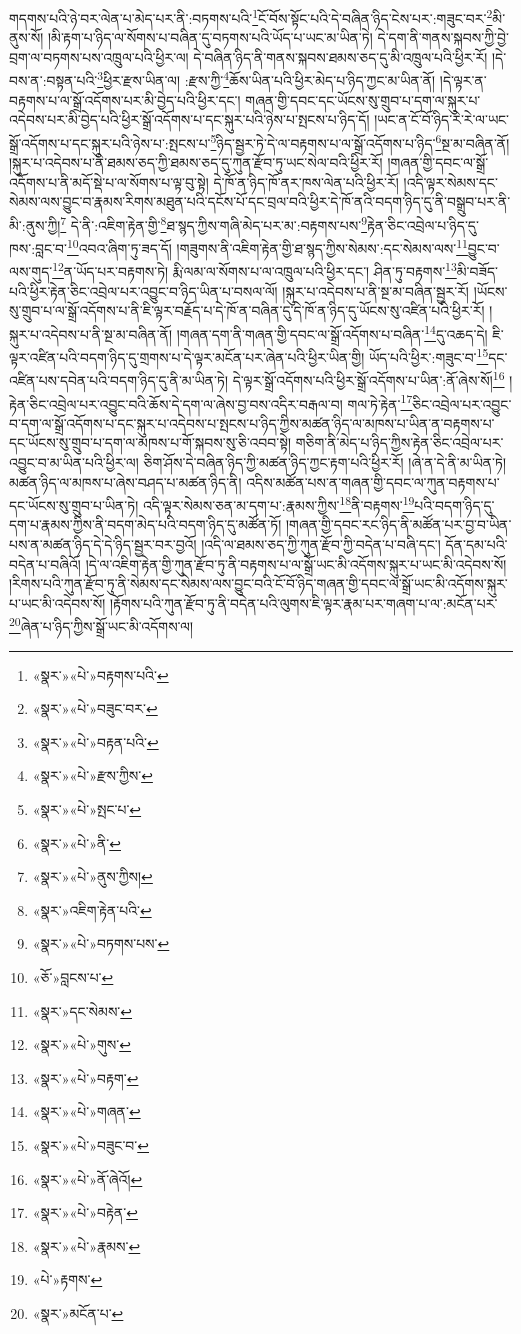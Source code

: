 གདགས་པའི་ཉེ་བར་ལེན་པ་མེད་པར་ནི་:བཏགས་པའི་\footnote{«སྣར་»«པེ་»བརྟགས་པའི་}ངོ་བོས་སྟོང་པའི་དེ་བཞིན་ཉིད་ངེས་པར་:གཟུང་བར་\footnote{«སྣར་»«པེ་»བཟུང་བར་}མི་ནུས་སོ། །མི་རྟག་པ་ཉིད་ལ་སོགས་པ་བཞིན་དུ་བཏགས་པའི་ཡོད་པ་ཡང་མ་ཡིན་ཏེ། དེ་དག་ནི་གནས་སྐབས་ཀྱི་བྱེ་བྲག་ལ་བཏགས་པས་འཁྲུལ་པའི་ཕྱིར་ལ། དེ་བཞིན་ཉིད་ནི་གནས་སྐབས་ཐམས་ཅད་དུ་མི་འཁྲུལ་པའི་ཕྱིར་རོ། །དེ་བས་ན་:བསྟན་པའི་\footnote{«སྣར་»«པེ་»བརྟན་པའི་}ཕྱིར་རྫས་ཡིན་ལ། :རྫས་ཀྱི་\footnote{«སྣར་»«པེ་»རྫས་ཀྱིས་}ཆོས་ཡིན་པའི་ཕྱིར་མེད་པ་ཉིད་ཀྱང་མ་ཡིན་ནོ། །དེ་ལྟར་ན་བརྟགས་པ་ལ་སྒྲོ་འདོགས་པར་མི་བྱེད་པའི་ཕྱིར་དང་། གཞན་གྱི་དབང་དང་ཡོངས་སུ་གྲུབ་པ་དག་ལ་སྐུར་པ་འདེབས་པར་མི་བྱེད་པའི་ཕྱིར་སྒྲོ་འདོགས་པ་དང་སྐུར་པའི་ཉེས་པ་སྤངས་པ་ཉིད་དོ། །ཡང་ན་ངོ་བོ་ཉིད་རེ་རེ་ལ་ཡང་སྒྲོ་འདོགས་པ་དང་སྐུར་པའི་ཉེས་པ་:སྤངས་པ་\footnote{«སྣར་»«པེ་»སྤང་པ་}ཉིད་སྦྱར་ཏེ་དེ་ལ་བརྟགས་པ་ལ་སྒྲོ་འདོགས་པ་ཉིད་\footnote{«སྣར་»«པེ་»ནི་}སྔ་མ་བཞིན་ནོ། །སྐུར་པ་འདེབས་པ་ནི་ཐམས་ཅད་ཀྱི་ཐམས་ཅད་དུ་ཀུན་རྫོབ་ཏུ་ཡང་སེལ་བའི་ཕྱིར་རོ། །གཞན་གྱི་དབང་ལ་སྒྲོ་འདོགས་པ་ནི་མདོ་སྡེ་པ་ལ་སོགས་པ་ལྟ་བུ་སྟེ། དེ་ཁོ་ན་ཉིད་ཁོ་ནར་ཁས་ལེན་པའི་ཕྱིར་རོ། །འདི་ལྟར་སེམས་དང་སེམས་ལས་བྱུང་བ་རྣམས་རིགས་མཐུན་པའི་དངོས་པོ་དང་བྲལ་བའི་ཕྱིར་དེ་ཁོ་ནའི་བདག་ཉིད་དུ་ནི་བསྒྲུབ་པར་ནི་མི་:ནུས་ཀྱི།\footnote{«སྣར་»«པེ་»ནུས་ཀྱིས།} དེ་ནི་:འཇིག་རྟེན་གྱི་\footnote{«སྣར་»འཇིག་རྟེན་པའི་}ཐ་སྙད་ཀྱིས་གཞི་མེད་པར་མ་:བརྟགས་པས་\footnote{«སྣར་»«པེ་»བཏགས་པས་}རྟེན་ཅིང་འབྲེལ་པ་ཉིད་དུ་ཁས་:བླང་བ་\footnote{«ཅོ་»བླངས་པ་}འབའ་ཞིག་ཏུ་ཟད་དོ། །གཟུགས་ནི་འཇིག་རྟེན་གྱི་ཐ་སྙད་ཀྱིས་སེམས་:དང་སེམས་ལས་\footnote{«སྣར་»དང་སེམས་}བྱུང་བ་ལས་གུད་\footnote{«སྣར་»«པེ་»གུས་}ན་ཡོད་པར་བརྟགས་ཏེ། རྨི་ལམ་ལ་སོགས་པ་ལ་འཁྲུལ་པའི་ཕྱིར་དང་། ཤིན་ཏུ་བརྟགས་\footnote{«སྣར་»«པེ་»བརྟག་}མི་བཟོད་པའི་ཕྱིར་རྟེན་ཅིང་འབྲེལ་པར་འབྱུང་བ་ཉིད་ཡིན་པ་བསལ་ལོ། །སྐུར་པ་འདེབས་པ་ནི་སྔ་མ་བཞིན་སྦྱར་རོ། །ཡོངས་སུ་གྲུབ་པ་ལ་སྒྲོ་འདོགས་པ་ནི་ཇི་ལྟར་བརྗོད་པ་དེ་ཁོ་ན་བཞིན་དུ་དེ་ཁོ་ན་ཉིད་དུ་ཡོངས་སུ་འཛིན་པའི་ཕྱིར་རོ། །སྐུར་པ་འདེབས་པ་ནི་སྔ་མ་བཞིན་ནོ། །གཞན་དག་ནི་གཞན་གྱི་དབང་ལ་སྒྲོ་འདོགས་པ་བཞིན་\footnote{«སྣར་»«པེ་»གཞན་}དུ་འཆད་དེ། ཇི་ལྟར་འཛིན་པའི་བདག་ཉིད་དུ་གྲགས་པ་དེ་ལྟར་མངོན་པར་ཞེན་པའི་ཕྱིར་ཡིན་གྱི། ཡོད་པའི་ཕྱིར་:གཟུང་བ་\footnote{«སྣར་»«པེ་»བཟུང་བ་}དང་འཛིན་པས་དབེན་པའི་བདག་ཉིད་དུ་ནི་མ་ཡིན་ཏེ། དེ་ལྟར་སྒྲོ་འདོགས་པའི་ཕྱིར་སྒྲོ་འདོགས་པ་ཡིན་:ནོ་ཞེས་སོ།\footnote{«སྣར་»«པེ་»ནོ་ཞེའོ།} །རྟེན་ཅིང་འབྲེལ་པར་འབྱུང་བའི་ཆོས་དེ་དག་ལ་ཞེས་བྱ་བས་འདིར་བརྒལ་བ། གལ་ཏེ་རྟེན་\footnote{«སྣར་»«པེ་»བརྟེན་}ཅིང་འབྲེལ་པར་འབྱུང་བ་དག་ལ་སྒྲོ་འདོགས་པ་དང་སྐུར་པ་འདེབས་པ་སྤངས་པ་ཉིད་ཀྱིས་མཚན་ཉིད་ལ་མཁས་པ་ཡིན་ན་བརྟགས་པ་དང་ཡོངས་སུ་གྲུབ་པ་དག་ལ་མཁས་པ་གོ་སྐབས་སུ་ཅི་འབབ་སྟེ། གཅིག་ནི་མེད་པ་ཉིད་ཀྱིས་རྟེན་ཅིང་འབྲེལ་པར་འབྱུང་བ་མ་ཡིན་པའི་ཕྱིར་ལ། ཅིག་ཤོས་དེ་བཞིན་ཉིད་ཀྱི་མཚན་ཉིད་ཀྱང་རྟག་པའི་ཕྱིར་རོ། །ཞེ་ན་དེ་ནི་མ་ཡིན་ཏེ། མཚན་ཉིད་ལ་མཁས་པ་ཞེས་བཤད་པ་མཚན་ཉིད་ནི། འདིས་མཚོན་པས་ན་གཞན་གྱི་དབང་ལ་ཀུན་བརྟགས་པ་དང་ཡོངས་སུ་གྲུབ་པ་ཡིན་ཏེ། འདི་ལྟར་སེམས་ཅན་མ་དག་པ་:རྣམས་ཀྱིས་\footnote{«སྣར་»«པེ་»རྣམས་}ནི་བརྟགས་\footnote{«པེ་»རྟགས་}པའི་བདག་ཉིད་དུ་དག་པ་རྣམས་ཀྱིས་ནི་བདག་མེད་པའི་བདག་ཉིད་དུ་མཚོན་ཏོ། །གཞན་གྱི་དབང་རང་ཉིད་ནི་མཚོན་པར་བྱ་བ་ཡིན་པས་ན་མཚན་ཉིད་དེ་དེ་ཉིད་སྦྱར་བར་བྱའོ། །འདི་ལ་ཐམས་ཅད་ཀྱི་ཀུན་རྫོབ་ཀྱི་བདེན་པ་བཞི་དང་། དོན་དམ་པའི་བདེན་པ་བཞིའོ། །དེ་ལ་འཇིག་རྟེན་གྱི་ཀུན་རྫོབ་ཏུ་ནི་བརྟགས་པ་ལ་སྒྲོ་ཡང་མི་འདོགས་སྐུར་པ་ཡང་མི་འདེབས་སོ། །རིགས་པའི་ཀུན་རྫོབ་ཏུ་ནི་སེམས་དང་སེམས་ལས་བྱུང་བའི་ངོ་བོ་ཉིད་གཞན་གྱི་དབང་ལ་སྒྲོ་ཡང་མི་འདོགས་སྐུར་པ་ཡང་མི་འདེབས་སོ། །རྟོགས་པའི་ཀུན་རྫོབ་ཏུ་ནི་བདེན་པའི་ལུགས་ཇི་ལྟར་རྣམ་པར་གཞག་པ་ལ་:མངོན་པར་\footnote{«སྣར་»མངོན་པ་}ཞེན་པ་ཉིད་ཀྱིས་སྒྲོ་ཡང་མི་འདོགས་ལ། 
